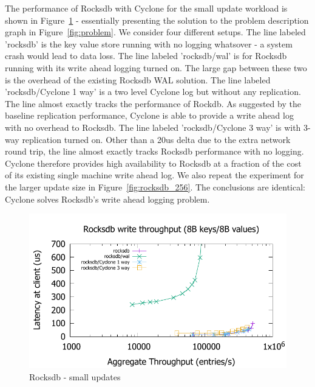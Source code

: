 \documentclass[pageno]{jpaper}
\begin{document}
The performance of Rocksdb with Cyclone for the small update workload is shown
in Figure~\ref{fig:rocksdb} - essentially presenting the solution to the problem
description graph in Figure~\ref{fig:problem}.  We consider four different
setups. The line labeled 'rocksdb' is the key value store running with no
logging whatsover - a system crash would lead to data loss. The line labeled
'rocksdb/wal' is for Rocksdb running with its write ahead logging turned on. The
large gap between these two is the overhead of the existing Rocksdb WAL
solution. The line labeled 'rocksdb/Cyclone 1 way' is a two level Cyclone log
but without any replication. The line almost exactly tracks the performance of
Rockdb. As suggested by the baseline replication performance, Cyclone is able to
provide a write ahead log with no overhead to Rocksdb. The line labeled
'rocksdb/Cyclone 3 way' is with 3-way replication turned on. Other than a 20us
delta due to the extra network round trip, the line almost exactly tracks
Rocksdb performance with no logging. Cyclone therefore provides high
availability to Rocksdb at a fraction of the cost of its existing single machine
write ahead log. We also repeat the experiment for the larger update size in
Figure~\ref{fig:rocksdb_256}. The conclusions are identical: Cyclone solves
Rocksdb's write ahead logging problem.

\begin{figure}
\includegraphics[scale=0.6]{results2/rocksdb.pdf}
\caption{Rocksdb - small updates}
\label{fig:rocksdb}
\end{figure}
\end{document}
